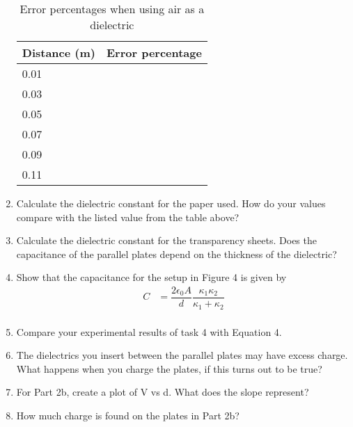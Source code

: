 \documentclass [12pt, letterpaper, twoside] {article}
\begin{document}
\begin{enumerate}
\begin{table}
    \begin{tabular}{| l | r |}
      \hline\hline
      Distance (m) & Error percentage \\
      \hline
      0.01 & \\
      \hline
      0.03 & \\
      \hline
      0.05 & \\
      \hline
      0.07 & \\
      \hline
      0.09 & \\
      \hline
      0.11 & \\
      \hline\hline
    \end{tabular}
    \caption{Error percentages when using air as a dielectric}
  \end{table}
   
  \item  Calculate the dielectric constant for the paper used.  How do your values compare with the listed value from the table above?
  \item Calculate the dielectric constant for the transparency sheets.  Does the capacitance of the parallel plates depend on the thickness of the dielectric?
  \item Show that the capacitance for the setup in Figure 4 is given by
  \begin{equation}
    \begin{split}
      C &= \dfrac{2\epsilon_{0}A}{d}\dfrac{\kappa_{1}\kappa_{2}}{\kappa_{1}+\kappa_{2}} \\
    \end{split}
\end{equation}
  \item Compare your experimental results of task 4 with Equation 4.
  \item The dielectrics you insert between the parallel plates may have excess charge.  What happens when you charge the plates, if this turns out to be true?
  \item For Part 2b, create a plot of V vs d.  What does the slope represent?
  \item How much charge is found on the plates in Part 2b?
\end{enumerate}

\circuita

\circuitb
\end{document}
